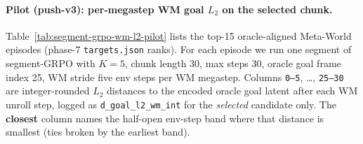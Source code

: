 \documentclass{article}
\begin{document}
\paragraph{Pilot (push-v3): per-megastep WM goal $L_2$ on the selected chunk.}
Table~\ref{tab:segment-grpo-wm-l2-pilot} lists the top-15 oracle-aligned Meta-World episodes (phase-7 \texttt{targets.json} ranks). For each episode we run one segment of segment-GRPO with $K{=}5$, chunk length 30, max steps 30, oracle goal frame index 25, WM stride five env steps per WM megastep. Columns \texttt{0--5}, \ldots, \texttt{25--30} are integer-rounded $L_2$ distances to the encoded oracle goal latent after each WM unroll step, logged as \texttt{d\_goal\_l2\_wm\_int} for the \emph{selected} candidate only. The \textbf{closest} column names the half-open env-step band where that distance is smallest (ties broken by the earliest band).

\begin{table}[t]
  \caption{WM integer goal $L_2$ by megastep (stride 5) for the selected chunk, push-v3 top-15 episodes.}
  \label{tab:segment-grpo-wm-l2-pilot}
  \centering
\end{table}
\end{document}
